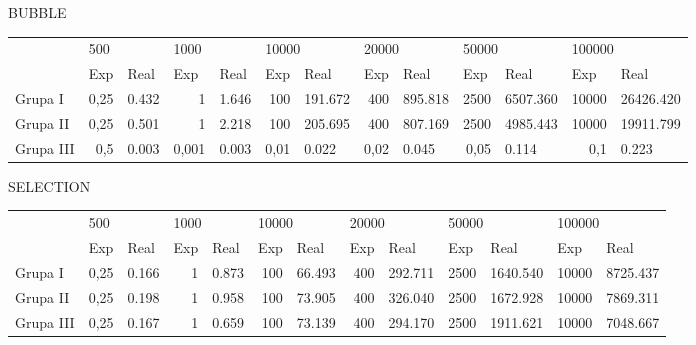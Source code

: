 \documentclass{article}
\begin{document}
BUBBLE 
\begin{table}[H]
    \begin{tabular}{lrlrlrlrlrlrl}
                       & \multicolumn{2}{l}{500}         & \multicolumn{2}{l}{1000}        & \multicolumn{2}{l}{10000}                                     & \multicolumn{2}{l}{20000}         & \multicolumn{2}{l}{50000}          & \multicolumn{2}{l}{100000}          \\
    \multirow{-2}{*}{} & \multicolumn{1}{l}{Exp} & Real  & \multicolumn{1}{l}{Exp} & Real  & \multicolumn{1}{l}{Exp}                             & Real    & \multicolumn{1}{l}{Exp} & Real    & \multicolumn{1}{l}{Exp} & Real     & \multicolumn{1}{l}{Exp} & Real      \\
    Grupa I            & 0,25                    & 0.432 & 1                       & 1.646 &  100  & 191.672 & 400                     & 895.818 & 2500                    & 6507.360 & 10000                   & 26426.420 \\
    Grupa II           & 0,25                    & 0.501 & 1                       & 2.218 &  100  & 205.695 & 400                     & 807.169 & 2500                    & 4985.443 & 10000                   & 19911.799 \\
    Grupa III          & 0,5                     & 0.003 & 0,001                   & 0.003 &  0,01 & 0.022   & 0,02                    & 0.045   & 0,05                    & 0.114    & 0,1                     & 0.223    
    \end{tabular}
    \end{table}
SELECTION

\begin{table}[H]
    \begin{tabular}{lrlrlrlrlrlrl}
    \multirow{2}{*}{} & \multicolumn{2}{l}{500}         & \multicolumn{2}{l}{1000}        & \multicolumn{2}{l}{10000}        & \multicolumn{2}{l}{20000}         & \multicolumn{2}{l}{50000}          & \multicolumn{2}{l}{100000}         \\
                      & \multicolumn{1}{l}{Exp} & Real  & \multicolumn{1}{l}{Exp} & Real  & \multicolumn{1}{l}{Exp} & Real   & \multicolumn{1}{l}{Exp} & Real    & \multicolumn{1}{l}{Exp} & Real     & \multicolumn{1}{l}{Exp} & Real     \\
    Grupa I           & 0,25                    & 0.166 & 1                       & 0.873 & 100                     & 66.493 & 400                     & 292.711 & 2500                    & 1640.540 & 10000                   & 8725.437 \\
    Grupa II          & 0,25                    & 0.198 & 1                       & 0.958 & 100                     & 73.905 & 400                     & 326.040 & 2500                    & 1672.928 & 10000                   & 7869.311 \\
    Grupa III         & 0,25                    & 0.167 & 1                       & 0.659 & 100                     & 73.139 & 400                     & 294.170 & 2500                    & 1911.621 & 10000                   & 7048.667
    \end{tabular}
    \end{table}
\end{document}
